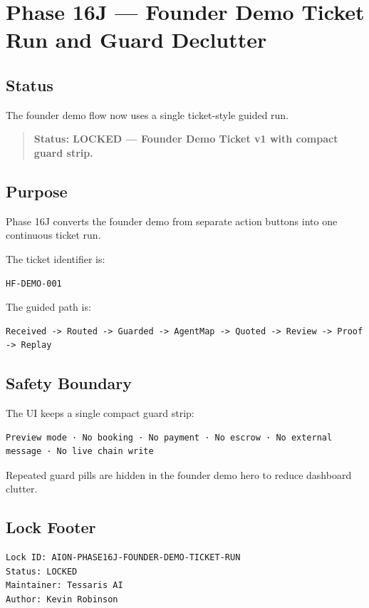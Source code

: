 \section{Phase 16J --- Founder Demo Ticket Run and Guard Declutter}
\label{sec:phase16j-founder-demo-ticket-run}

\subsection{Status}

The founder demo flow now uses a single ticket-style guided run.

\begin{quote}
\textbf{Status: LOCKED --- Founder Demo Ticket v1 with compact guard strip.}
\end{quote}

\subsection{Purpose}

Phase 16J converts the founder demo from separate action buttons into one continuous ticket run.

The ticket identifier is:

\begin{verbatim}
HF-DEMO-001
\end{verbatim}

The guided path is:

\begin{verbatim}
Received -> Routed -> Guarded -> AgentMap -> Quoted -> Review -> Proof -> Replay
\end{verbatim}

\subsection{Safety Boundary}

The UI keeps a single compact guard strip:

\begin{verbatim}
Preview mode · No booking · No payment · No escrow · No external message · No live chain write
\end{verbatim}

Repeated guard pills are hidden in the founder demo hero to reduce dashboard clutter.

\subsection{Lock Footer}

\begin{verbatim}
Lock ID: AION-PHASE16J-FOUNDER-DEMO-TICKET-RUN
Status: LOCKED
Maintainer: Tessaris AI
Author: Kevin Robinson
\end{verbatim}
